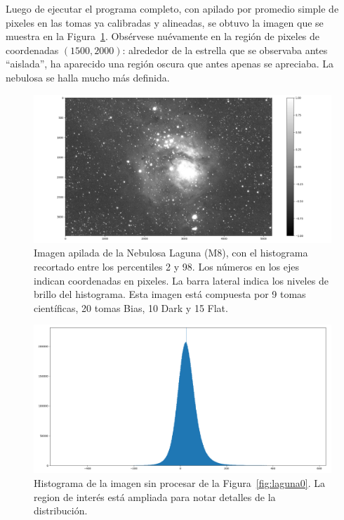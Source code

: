 \documentclass[a4paper, 12pt]{article}
\begin{document}
Luego de ejecutar el programa completo, con apilado por promedio simple de pixeles en las tomas ya calibradas y alineadas, se obtuvo la imagen que se muestra en la Figura~\ref{fig:apiladofinal}. Obsérvese nuévamente en la región  de pixeles de coordenadas $(1500, 2000)$: alrededor de la estrella que se observaba antes ``aislada'', ha aparecido una región oscura que antes apenas se apreciaba. La nebulosa se halla mucho más definida.

\begin{figure}[!h]
  \centering
  \includegraphics[width=\textwidth]{img/apiladofinal_scikit.png}
  \caption{\label{fig:apiladofinal} Imagen apilada de la Nebulosa Laguna (M8), con el histograma recortado entre los percentiles 2 y 98. Los números en los ejes indican coordenadas en pixeles. La barra lateral indica los niveles de brillo del histograma. Esta imagen está compuesta por 9 tomas científicas, 20 tomas Bias, 10 Dark y 15 Flat.}
\end{figure}



\begin{figure}[!h]
  \centering
  \includegraphics[width=\textwidth]{img/histo_00004.png}
  \caption{\label{fig:histo_sp} Histograma de la imagen sin procesar de la Figura~\ref{fig:laguna0}. La region de interés está ampliada para notar detalles de la distribución.}
\end{figure}
\end{document}
